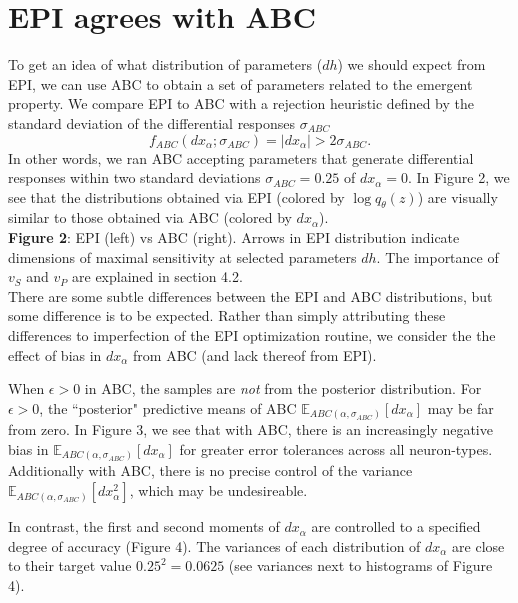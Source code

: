 \documentclass[11pt]{article}
\begin{document}
\section{EPI agrees with ABC}
To get an idea of what distribution of parameters ($dh$) we should expect from EPI, we can use ABC to obtain a set of parameters related to the emergent property.  
We compare EPI to ABC with a rejection heuristic defined by the standard deviation of the differential responses $\sigma_{ABC}$
 \[f_{ABC}(dx_\alpha; \sigma_{ABC}) = |dx_\alpha| > 2\sigma_{ABC}.\]
 In other words, we ran ABC accepting parameters that generate differential responses within two standard deviations $\sigma_{ABC}=0.25$ of $dx_\alpha = 0$.
 In Figure 2, we see that the distributions obtained via EPI (colored by $\log q_\theta(z)$) are visually similar to those obtained via ABC (colored by $dx_\alpha$). \\
 
 \textbf{Figure 2}: EPI (left) vs ABC (right).  Arrows in EPI distribution indicate dimensions of maximal sensitivity at selected parameters $dh$. The importance of $v_S$ and $v_P$ are explained in section 4.2. \\

There are some subtle differences between the EPI and ABC distributions, but some difference is to be expected.
Rather than simply attributing these differences to imperfection of the EPI optimization routine, we consider the the effect of bias in $dx_\alpha$ from ABC (and lack thereof from EPI).

When $\epsilon > 0$ in ABC, the samples are \textit{not} from the posterior distribution.
For $\epsilon > 0$, the ``posterior" predictive means of ABC $\mathbb{E}_{ABC(\alpha, \sigma_{ABC})}\left[dx_\alpha \right]$ may be far from zero.
In Figure 3, we see that with ABC, there is an increasingly negative bias in $\mathbb{E}_{ABC(\alpha, \sigma_{ABC})}\left[dx_\alpha \right]$ for greater error tolerances across all neuron-types.  
Additionally with ABC, there is no precise control of the variance $\mathbb{E}_{ABC(\alpha, \sigma_{ABC})}\left[dx_\alpha^2 \right]$, which may be undesireable.

In contrast, the first and second moments of $dx_\alpha$ are controlled to a specified degree of accuracy (Figure 4).
The variances of each distribution of $dx_\alpha$ are close to their target value $0.25^2 = 0.0625$ (see variances next to histograms of Figure 4). 
\end{document}
